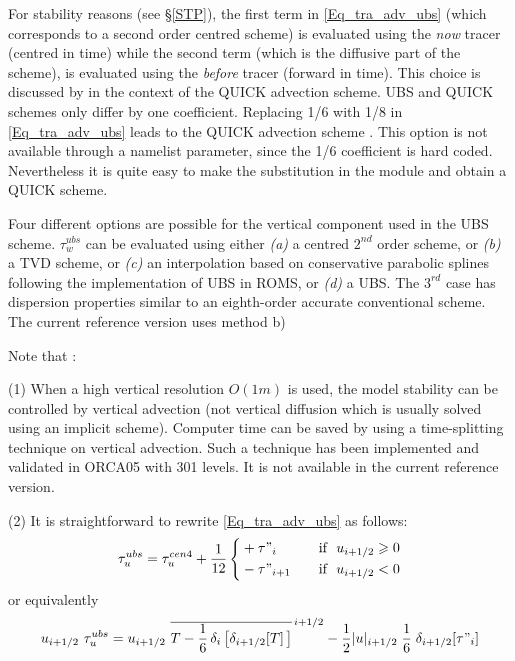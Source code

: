 \documentclass[NEMO_book]{subfiles}
\begin{document}
For stability reasons  (see \S\ref{STP}),
the first term  in \eqref{Eq_tra_adv_ubs} (which corresponds to a second order centred scheme) 
is evaluated using the \textit{now} tracer (centred in time) while the 
second term (which is the diffusive part of the scheme), is 
evaluated using the \textit{before} tracer (forward in time). 
This choice is discussed by \citet{Webb_al_JAOT98} in the context of the 
QUICK advection scheme. UBS and QUICK schemes only differ 
by one coefficient. Replacing 1/6 with 1/8 in \eqref{Eq_tra_adv_ubs} 
leads to the QUICK advection scheme \citep{Webb_al_JAOT98}. 
This option is not available through a namelist parameter, since the 
1/6 coefficient is hard coded. Nevertheless it is quite easy to make the 
substitution in the  module and obtain a QUICK scheme.

Four different options are possible for the vertical 
component used in the UBS scheme. $\tau _w^{ubs}$ can be evaluated 
using either \textit{(a)} a centred $2^{nd}$ order scheme, or  \textit{(b)} 
a TVD scheme, or  \textit{(c)} an interpolation based on conservative 
parabolic splines following the \citet{Shchepetkin_McWilliams_OM05} 
implementation of UBS in ROMS, or  \textit{(d)} a UBS. The $3^{rd}$ case 
has dispersion properties similar to an eighth-order accurate conventional scheme.
The current reference version uses method b)

Note that :

(1) When a high vertical resolution $O(1m)$ is used, the model stability can 
be controlled by vertical advection (not vertical diffusion which is usually 
solved using an implicit scheme). Computer time can be saved by using a 
time-splitting technique on vertical advection. Such a technique has been 
implemented and validated in ORCA05 with 301 levels. It is not available 
in the current reference version. 

(2) It is straightforward to rewrite \eqref{Eq_tra_adv_ubs} as follows:
\begin{equation} \label{Eq_traadv_ubs2}
\tau _u^{ubs} = \tau _u^{cen4} + \frac{1}{12} \left\{	 
   \begin{aligned}
	& + \tau"_i			& \quad \text{if }\ u_{i+1/2} \geqslant 0 \\
	&  - \tau"_{i+1}		& \quad \text{if }\ u_{i+1/2}       <       0
   \end{aligned}    \right.
\end{equation}
or equivalently 
\begin{equation} \label{Eq_traadv_ubs2b}
u_{i+1/2} \ \tau _u^{ubs} 
=u_{i+1/2} \ \overline{ T - \frac{1}{6}\,\delta _i\left[ \delta_{i+1/2}[T] \,\right] }^{\,i+1/2}
- \frac{1}{2} |u|_{i+1/2} \;\frac{1}{6} \;\delta_{i+1/2}[\tau"_i]
\end{equation}
\end{document}
